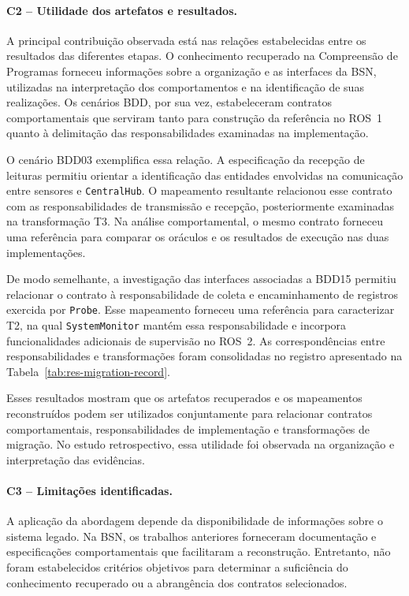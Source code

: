 \paragraph{C2 -- Utilidade dos artefatos e resultados.}

A principal contribuição observada está nas relações estabelecidas entre os resultados das diferentes etapas. O conhecimento recuperado na Compreensão de Programas forneceu informações sobre a organização e as interfaces da BSN, utilizadas na interpretação dos comportamentos e na identificação de suas realizações. Os cenários BDD, por sua vez, estabeleceram contratos comportamentais que serviram tanto para construção da referência no ROS~1 quanto à delimitação das responsabilidades examinadas na implementação.

O cenário BDD03 exemplifica essa relação. A especificação da recepção de leituras permitiu orientar a identificação das entidades envolvidas na comunicação entre sensores e \texttt{CentralHub}. O mapeamento resultante relacionou esse contrato com as responsabilidades de transmissão e recepção, posteriormente examinadas na transformação T3. Na análise comportamental, o mesmo contrato forneceu uma referência para comparar os oráculos e os resultados de execução nas duas implementações.


De modo semelhante, a investigação das interfaces associadas a BDD15 permitiu relacionar o contrato à responsabilidade de coleta e encaminhamento de registros exercida por \texttt{Probe}. Esse mapeamento forneceu uma referência para caracterizar T2, na qual \texttt{SystemMonitor} mantém essa responsabilidade e incorpora funcionalidades adicionais de supervisão no ROS~2. As correspondências entre responsabilidades e transformações foram consolidadas no registro apresentado na Tabela~\ref{tab:res-migration-record}.

Esses resultados mostram que os artefatos recuperados e os mapeamentos reconstruídos podem ser utilizados conjuntamente para relacionar contratos comportamentais, responsabilidades de implementação e transformações de migração. No estudo retrospectivo, essa utilidade foi observada na organização e interpretação das evidências.

\paragraph{C3 -- Limitações identificadas.}

A aplicação da abordagem depende da disponibilidade de informações sobre o sistema legado. Na BSN, os trabalhos anteriores forneceram documentação e especificações comportamentais que facilitaram a reconstrução. Entretanto, não foram estabelecidos critérios objetivos para determinar a suficiência do conhecimento recuperado ou a abrangência dos contratos selecionados.

